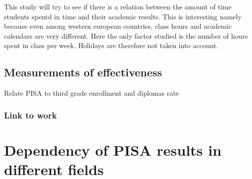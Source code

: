 \documentclass[12pt,a4paper]{article}
\begin{document}
This study will try to see if there is a relation between the amount of time students spentd in time and their academic results. This is interesting namely because even among western european countries, class hours and academic calendars are very different. Here the only factor studied is the number of hours spent in class per week. Holidays are therefore not taken into account.

\subsection{Measurements of effectiveness}

Relate PISA to third grade enrollment and diplomas rate

\subsubsection{Link to work}



\section{Dependency of PISA results in different fields}
\end{document}
